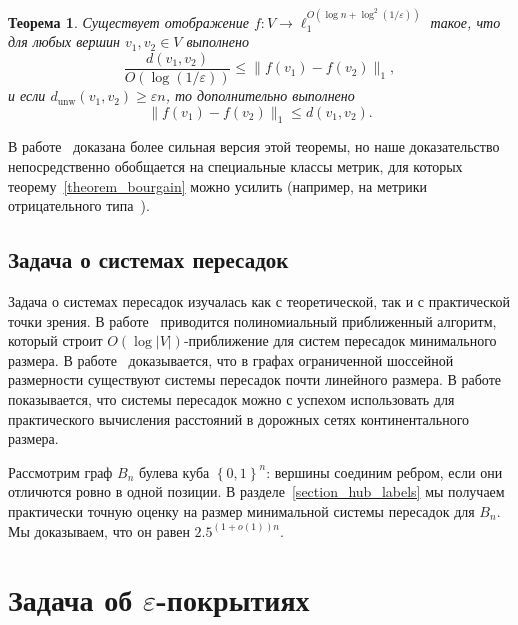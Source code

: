 \documentclass[12pt]{article}
\newcommand{\eps}{\varepsilon}
\newcommand{\dunw}{d_{\mathrm{unw}}}
\newcommand{\set}[1]{\left\{#1\right\}}
\newcommand{\abs}[1]{\left|#1\right|}
\newcommand{\zo}{\set{0, 1}}
\newtheorem{theorem}{Теорема}
\begin{document}
    \begin{theorem}
        Существует отображение $f \colon V \to \ell_1^{O(\log n + \log^2 (1 / \eps))}$ такое, что для любых вершин 
        $v_1, v_2 \in V$ выполнено
        $$
            \frac{d(v_1, v_2)}{O(\log (1/\eps))} \leq \|f(v_1) - f(v_2)\|_1,
        $$
        и если $\dunw(v_1, v_2) \geq \eps n$, то дополнительно выполнено
        $$
            \|f(v_1) - f(v_2)\|_1 \leq d(v_1, v_2).
        $$
    \end{theorem}
    В работе~\cite{ABCDGKNS05} доказана более сильная версия этой теоремы, но наше доказательство непосредственно
    обобщается на
    специальные классы метрик, для которых теорему~\ref{theorem_bourgain} можно усилить (например, на метрики
    отрицательного типа~\cite{ALN05}).
    \subsection{Задача о системах пересадок}

    Задача о системах пересадок изучалась как с теоретической, так и с практической точки зрения.
    В работе~\cite{CHKZ02} приводится полиномиальный приближенный алгоритм, который строит $O(\log \abs{V})$-приближение
    для систем пересадок минимального размера.
    В работе~\cite{AFGW10} доказывается, что в графах ограниченной шоссейной размерности существуют системы пересадок
    почти линейного размера.
    В работе~\cite{ADGW11} показывается, что системы пересадок можно с успехом использовать для практического
    вычисления расстояний в дорожных сетях континентального размера.

    Рассмотрим граф $B_n$ булева куба $\zo^n$: вершины соединим ребром, если они отличются ровно в одной позиции.
    В разделе~\ref{section_hub_labels} мы получаем практически точную оценку на размер минимальной системы пересадок
    для $B_n$. Мы доказываем, что он равен $2.5^{(1 + o(1)) n}$.
    \section{Задача об $\eps$-покрытиях}
    \label{section_eps_covers}
\end{document}
